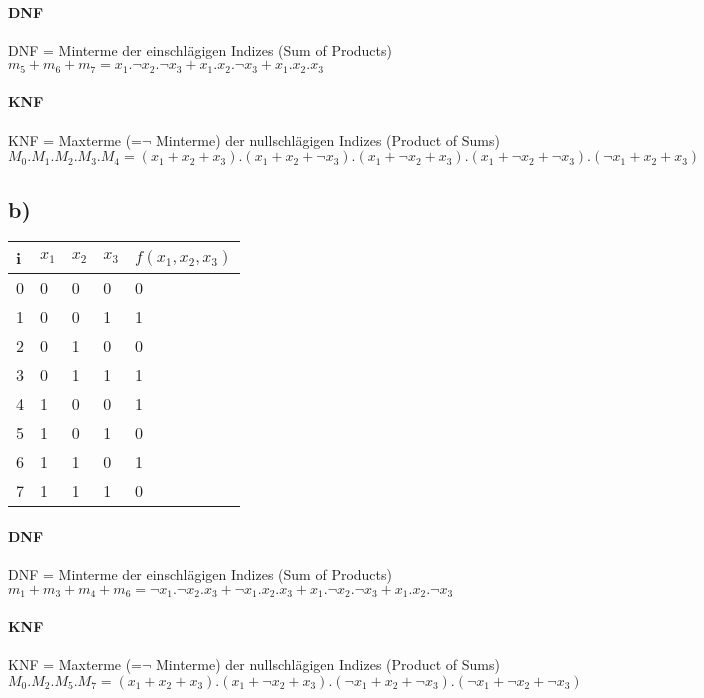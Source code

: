 \paragraph{DNF}
DNF = Minterme der einschlägigen Indizes (Sum of Products)\\
$m_5 + m_6 + m_7 = x_1.\neg x_2.\neg x_3 + x_1.x_2.\neg x_3 + x_1.x_2.x_3$

\paragraph{KNF}
KNF = Maxterme (=$\neg$ Minterme) der nullschlägigen Indizes (Product of Sums)\\
$M_0 . M_1 . M_2 . M_3 . M_4 = (x_1+x_2+x_3) . (x_1+x_2+\neg x_3) . (x_1+\neg x_2+x_3) . (x_1+\neg x_2+\neg x_3) . (\neg x_1+x_2+x_3)$

\subsection{b)}
\begin{tabular}{|l||l|l|l||l|}\hline
i & $x_1$ & $x_2$ & $x_3$ & $f(x_1,x_2,x_3)$ \\\hline\hline
0 & 0 & 0 & 0 & 0 \\\hline
1 & 0 & 0 & 1 & 1 \\\hline
2 & 0 & 1 & 0 & 0 \\\hline
3 & 0 & 1 & 1 & 1 \\\hline
4 & 1 & 0 & 0 & 1 \\\hline
5 & 1 & 0 & 1 & 0 \\\hline
6 & 1 & 1 & 0 & 1 \\\hline
7 & 1 & 1 & 1 & 0 \\\hline
\end{tabular}

\paragraph{DNF}
DNF = Minterme der einschlägigen Indizes (Sum of Products)\\
$m_1 + m_3 + m_4 + m_6 = \neg x_1.\neg x_2.x_3 + \neg x_1.x_2.x_3 + x_1.\neg x_2.\neg x_3 + x_1.x_2.\neg x_3$

\paragraph{KNF}
KNF = Maxterme (=$\neg$ Minterme) der nullschlägigen Indizes (Product of Sums)\\
$M_0 . M_2 . M_5 . M_7  = (x_1+x_2+x_3) . (x_1+\neg x_2+x_3) . (\neg x_1+x_2+\neg x_3) . (\neg x_1+\neg x_2+\neg x_3)$


